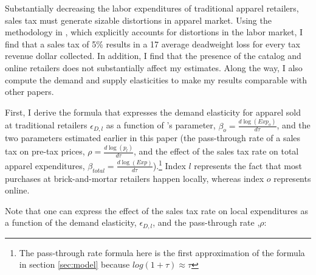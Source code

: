 \documentclass[12pt]{article}
\begin{document}
			
			Substantially decreasing the labor expenditures of traditional apparel retailers, sales tax must generate sizable distortions in apparel market. Using the methodology in \citet{goulder}, which explicitly accounts for distortions in the labor market, I find that a sales tax of 5\% results in a 17\textcent{} average deadweight loss for every tax revenue dollar collected. In addition, I find that the presence of the catalog and online retailers does not substantially affect my estimates. 
			Along the way, I also compute the demand and supply elasticities to make my results comparable with other papers. 
			
			
			First, I derive the formula that expresses the demand elasticity for apparel sold at traditional retailers $\epsilon_{D,l}$ as a function of \citet{einav}'s parameter, $\beta_{o}=\frac{d \log(Exp_o)}{d\tau}$, and the two parameters estimated earlier in this paper (the pass-through rate of a sales tax on pre-tax prices, $\rho=\frac{d \log (p_{l})}{d\tau}$, and the effect of the sales tax rate on total apparel expenditures, $\beta_{total}=\frac{d \log(Exp)}{d\tau}$).\footnote{The pass-through rate formula here is the first approximation of the formula in section \ref{sec:model} because $log(1+\tau)\approx\tau$} Index $l$ represents the fact that most purchases at brick-and-mortar retailers happen locally, whereas index $o$ represents online. 
			
			Note that one can express the effect of the sales tax rate on local expenditures as a function of the demand elasticity, $\epsilon_{D,l}$, and the pass-through rate ,$\rho$: 
			
			
			
\end{document}
